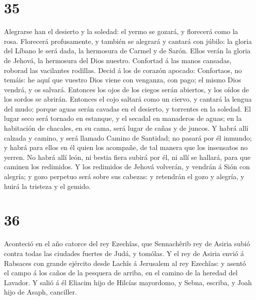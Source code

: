 \hypertarget{section-34}{%
\section{35}\label{section-34}}

 Alegrarse han el desierto y la soledad: el yermo se gozará,
y florecerá como la rosa.  Florecerá profusamente, y también
se alegrará y cantará con júbilo: la gloria del Líbano le será dada, la
hermosura de Carmel y de Sarón. Ellos verán la gloria de Jehová, la
hermosura del Dios nuestro.  Confortad á las manos cansadas,
roborad las vacilantes rodillas.  Decid á los de corazón
apocado: Confortaos, no temáis: he aquí que vuestro Dios viene con
venganza, con pago; el mismo Dios vendrá, y os salvará. 
Entonces los ojos de los ciegos serán abiertos, y los oídos de los
sordos se abrirán.  Entonces el cojo saltará como un ciervo,
y cantará la lengua del mudo; porque aguas serán cavadas en el desierto,
y torrentes en la soledad.  El lugar seco será tornado en
estanque, y el secadal en manaderos de aguas; en la habitación de
chacales, en su cama, será lugar de cañas y de juncos.  Y
habrá allí calzada y camino, y será llamado Camino de Santidad; no
pasará por él inmundo; y habrá para ellos en él quien los acompañe, de
tal manera que los insensatos no yerren.  No habrá allí
león, ni bestia fiera subirá por él, ni allí se hallará, para que
caminen los redimidos.  Y los redimidos de Jehová volverán,
y vendrán á Sión con alegría; y gozo perpetuo será sobre sus cabezas: y
retendrán el gozo y alegría, y huirá la tristeza y el gemido.

\hypertarget{section-35}{%
\section{36}\label{section-35}}

 Aconteció en el año catorce del rey Ezechîas, que
Sennachêrib rey de Asiria subió contra todas las ciudades fuertes de
Judá, y tomólas.  Y el rey de Asiria envió á Rabsaces con
grande ejército desde Lachîs á Jerusalem al rey Ezechîas: y asentó el
campo á los caños de la pesquera de arriba, en el camino de la heredad
del Lavador.  Y salió á él Eliacim hijo de Hilcías
mayordomo, y Sebna, escriba, y Joah hijo de Asaph, canciller.

